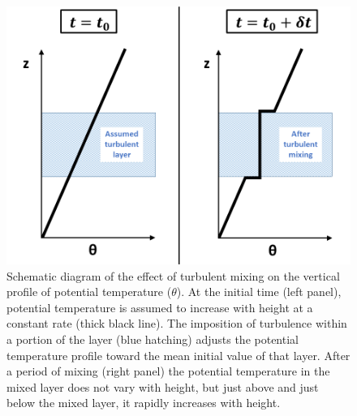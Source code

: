 \begin{figure}[ht]
\centerline{\includegraphics[width=39pc]{figures/Schematic2.png}}
   \caption{Schematic diagram of the effect of turbulent mixing on the vertical profile of potential temperature ($\theta$). At the initial time (left panel), potential temperature is assumed to increase with height at a constant rate (thick black line). The imposition of turbulence within a portion of the layer (blue hatching) adjusts the potential temperature profile toward the mean initial value of that layer. After a period of mixing (right panel) the potential temperature in the mixed layer does not vary with height, but just above and just below the mixed layer, it rapidly increases with height.}
\label{fig:schematic}
\end{figure}

